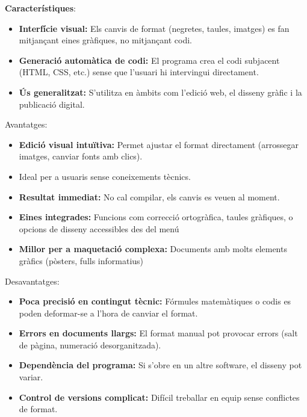 \textbf{Característiques}:
\begin{itemize}
 \item \textbf{Interfície visual:} Els canvis de format (negretes, taules, imatges) es fan mitjançant eines gràfiques, no mitjançant codi.
 \item \textbf{Generació automàtica de codi:} El programa crea el codi subjacent (HTML, CSS, etc.) sense que l'usuari hi intervingui directament.
 \item \textbf{Ús generalitzat:} S'utilitza en àmbits com l'edició web, el disseny gràfic i la publicació digital.
\end{itemize}
Avantatges:
\begin{itemize}
\item \textbf{Edició visual intuïtiva:} Permet ajustar el format directament (arrossegar imatges, canviar fonts amb clics).
 \item Ideal per a usuaris sense coneixements tècnics.
\item \textbf{Resultat immediat:} No cal compilar, els canvis es veuen al moment.
\item \textbf{Eines integrades:} Funcions com correcció ortogràfica, taules gràfiques, o opcions de disseny accessibles des del menú
\item \textbf{Millor per a maquetació complexa:} Documents amb molts elements gràfics (pòsters, fulls informatius)
\end{itemize}
Desavantatges:
\begin{itemize}
 \item \textbf{Poca precisió en contingut tècnic:} Fórmules matemàtiques o codis es poden deformar-se a l'hora de canviar el format.
 \item \textbf{Errors en documents llargs:} El format manual pot provocar errors (salt de pàgina, numeració desorganitzada).
 \item \textbf{Dependència del programa:} Si s'obre en un altre software, el disseny pot variar.
 \item \textbf{Control de versions complicat:} Difícil treballar en equip sense conflictes de format.
\end{itemize}

